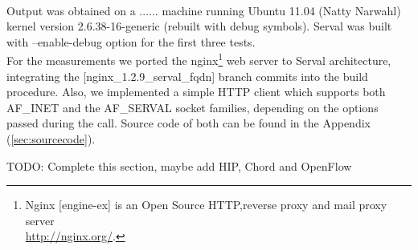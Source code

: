\paragraph{} Output was obtained on a ...... machine running Ubuntu 11.04 (Natty Narwahl) kernel version 2.6.38-16-generic (rebuilt with debug symbols). Serval was built with --enable-debug option for the first three tests.\\
For the measurements we ported the nginx\footnote{Nginx [engine-ex] is an Open Source HTTP,reverse proxy and mail proxy server\\ \url{http://nginx.org/}.} web server to Serval architecture, integrating the [nginx\_1.2.9\_serval\_fqdn] branch commits into the build procedure. Also, we implemented a simple HTTP client which supports both AF\_INET and the AF\_SERVAL socket families, depending on the options passed during the call. Source code of both can be found in the Appendix (\ref{sec:sourcecode}).


\iffalse
gprof
perf
google-profile tools
1) memory (oprofile)
2) CPU cycles (callgrind)
3) system calls time (strace)
4) timed execution of 1000 times
5) requests per second
6) Number of packers per request, bytes sent, packet structure
\fi

TODO: Complete this section, maybe add HIP, Chord and OpenFlow